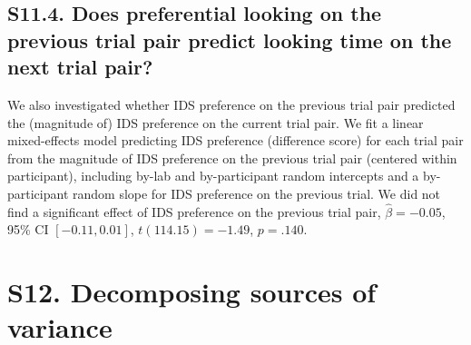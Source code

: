 \documentclass[
  man, donotrepeattitle,floatsintext]{apa6}
\begin{document}
\hypertarget{s11.4.-does-preferential-looking-on-the-previous-trial-pair-predict-looking-time-on-the-next-trial-pair}{%
\subsection{S11.4. Does preferential looking on the previous trial pair predict looking time on the next trial pair?}\label{s11.4.-does-preferential-looking-on-the-previous-trial-pair-predict-looking-time-on-the-next-trial-pair}}

We also investigated whether IDS preference on the previous trial pair predicted the (magnitude of) IDS preference on the current trial pair.
We fit a linear mixed-effects model predicting IDS preference (difference score) for each trial pair from the magnitude of IDS preference on the previous trial pair (centered within participant), including by-lab and by-participant random intercepts and a by-participant random slope for IDS preference on the previous trial.
We did not find a significant effect of IDS preference on the previous trial pair, \(\hat{\beta} = -0.05\), 95\% CI \([-0.11, 0.01]\), \(t(114.15) = -1.49\), \(p = .140\).

\hypertarget{s12.-decomposing-sources-of-variance}{%
\section{S12. Decomposing sources of variance}\label{s12.-decomposing-sources-of-variance}}
\end{document}
